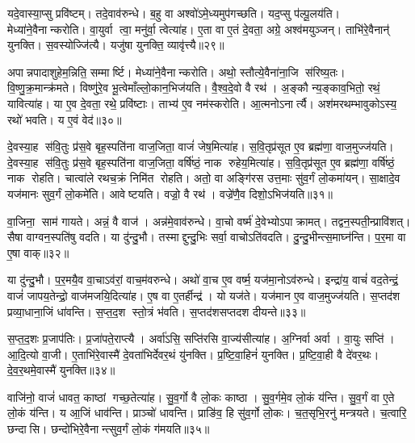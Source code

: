 यदे॒वास्या॒प्सु प्रवि॑ष्टम्।
तदे॒वाव॑रुन्धे।
ब॒हु वा अश्वो॑ऽमे॒ध्यमुप॑गच्छति।
यद॒प्सु प॑ल्पू॒लय॑ति।
मेध्या॑ने॒वै\-नान्करोति।
वा॒युर्वा त्वा॒ मनु॑र्वा॒ त्वेत्या॑ह।
ए॒ता वा ए॒तं दे॒वता॒ अग्रे॒ अश्व॑मयुञ्जन्।
ताभि॑रे॒वैनान्॑ युनक्ति।
स॒वस्योज्जि॑त्यै।
यजु॑षा युनक्ति॒ व्यावृ॑त्त्यै॥२९॥

अपान्नपादाशुहेम॒न्निति॒ सम्मार्ष्टि।
मेध्या॑ने॒वैनान्करोति।
अथो॒ स्तौत्ये॒वैना॑ना॒जि स॑रिष्य॒तः।
वि॒ष्णु॒क्र॒मान्क्र॑मते।
विष्णु॑रे॒व भू॒त्वेमाँल्लो॒कान॒भिज॑यति।
वै॒श्व॒दे॒वो वै रथ॑।
अ॒ङ्कौ न्य॒ङ्काव॒भितो॒ रथं॒ यावित्या॑ह।
या ए॒व दे॒वता॒ रथे॒ प्रवि॑ष्टाः।
ताभ्य॑ ए॒व नम॑स्करोति।
आ॒त्मनोऽनार्त्यै।
अश॑मरथम्भावुकोऽस्य॒ रथो॑ भवति।
य ए॒वं वेद॑॥३०॥\anuvakamend[स्व॒द॒य॒ति॒ प॒ल्पू॒लय॑ति॒ व्यावृ॑त्त्या॒ अनार्त्यै॒ द्वे च॑]

दे॒वस्या॒ह स॑वि॒तुः प्र॑स॒वे बृह॒स्पति॑ना वाज॒जिता॒ वाजं॑ जेष॒मित्या॑ह।
स॒वि॒तृप्र॑सूत ए॒व ब्रह्म॑णा॒ वाज॒मुज्ज॑यति।
दे॒वस्या॒ह स॑वि॒तुः प्र॑स॒वे बृह॒स्पति॑ना वाज॒जिता॒ वर्\mbox{}षि॑ष्ठं॒ नाक रुहेय॒मित्या॑ह।
स॒वि॒तृप्र॑सूत ए॒व ब्रह्म॑णा॒ वर्\mbox{}षि॑ष्ठं॒ नाक रोहति।
चात्वा॑ले रथच॒क्रं निमि॑त रोहति।
अतो॒ वा अङ्गि॑रस उत्त॒माः सु॑व॒र्गं लो॒कमा॑यन्।
सा॒क्षादे॒व यज॑मानः सुव॒र्गं लो॒कमे॑ति।
आवेष्टयति।
वज्रो॒ वै रथ॑।
वज्रे॑णै॒व दिशो॒ऽभिज॑यति॥३१॥

वा॒जिना॒ साम॑ गायते।
अन्नं॒ वै वाज॑।
अन्न॑मे॒वाव॑रुन्धे।
वा॒चो वर्ष्म॑ दे॒वेभ्योऽपाक्रामत्।
तद्वन॒स्पती॒न्प्रावि॑शत्।
सैषा वाग्वन॒स्पति॑षु वदति।
या दु॑न्दु॒भौ।
तस्माद्दुन्दु॒भिः सर्वा॒ वाचोऽति॑वदति।
दु॒न्दु॒भीन्त्स॒माघ्न॑न्ति।
प॒र॒मा वा ए॒षा वाक्॥३२॥

या दु॑न्दु॒भौ।
प॒र॒मयै॒व वा॒चाऽव॑रां॒ वाच॒म॑वरुन्धे।
अथो॑ वा॒च ए॒व वर्ष्म॒ यज॑मा॒नोऽव॑रुन्धे।
इन्द्रा॑य॒ वाचं॑ वद॒तेन्द्रं॒ वाजं॑ जापय॒तेन्द्रो॒ वाज॑मजयि॒दित्या॑ह।
ए॒ष वा ए॒तर्\mbox{}हीन्द्र॑।
यो यज॑ते।
यज॑मान ए॒व वाज॒मुज्ज॑यति।
स॒प्तद॑श प्रव्या॒धाना॒जिं धा॑वन्ति।
स॒प्त॒द॒श स्तो॒त्रं भ॑वति।
स॒प्तद॑शसप्तदश दीयन्ते॥३३॥

स॒प्त॒द॒शः प्र॒जाप॑तिः।
प्र॒जा॑पते॒राप्त्यै।
अर्वा॑ऽसि॒ सप्ति॑रसि वा॒ज्य॑सीत्या॑ह।
अ॒ग्निर्वा अर्वा।
वा॒युः सप्ति॑।
आ॒दि॒त्यो वा॒जी।
ए॒ताभि॑रे॒वास्मै॑ दे॒वता॑भिर्देवर॒थं यु॑नक्ति।
प्र॒ष्टि॒वा॒हिनं॑ युनक्ति।
प्र॒ष्टि॒वा॒ही वै दे॑वर॒थः।
दे॒व॒र॒थमे॒वास्मै॑ युनक्ति॥३४॥

वाजि॑नो॒ वाजं॑ धावत॒ काष्ठां गच्छ॒तेत्या॑ह।
सु॒व॒र्गो वै लो॒कः काष्ठा।
सु॒व॒र्गमे॒व लो॒कं य॑न्ति।
सु॒व॒र्गं वा ए॒ते लो॒कं य॑न्ति।
य आ॒जिं धाव॑न्ति।
प्राञ्चो॑ धावन्ति।
प्राङि॑व॒ हि सु॑व॒र्गो लो॒कः।
च॒त॒सृभि॒रनु॑ मन्त्रयते।
च॒त्वारि॒ छन्दासि।
छन्दो॑भिरे॒वैनान्त्सुव॒र्गं लो॒कं ग॑मयति॥३५॥

